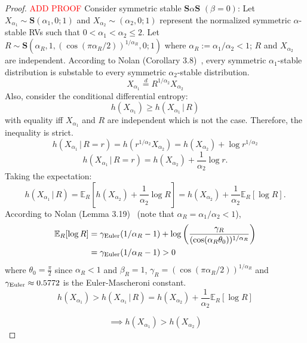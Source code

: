 \documentclass{article}
\theoremstyle{definition}
\begin{document}
\begin{proof}
    \textcolor{red}{ADD PROOF}
    Consider symmetric stable \(\mathbf{S}\alpha\mathbf{S}\) \((\beta=0)\):
    Let \(X_{\alpha_1}\sim\mathbf{S}(\alpha_1,0;1)\) and \(X_{\alpha_2}\sim(\alpha_2,0;1)\) represent the normalized symmetric \(\alpha\)-stable RVs such that \(0<\alpha_1<\alpha_2\le2\). Let \(R\sim\mathbf{S}(\alpha_R,1,(\cos(\pi\alpha_R/2))^{1/\alpha_R},0;1)\) where \(\alpha_R:=\alpha_1/\alpha_2<1\); \(R\) and \(X_{\alpha_2}\) are independent. According to Nolan (Corollary 3.8)~\cite{NolanJohnP2020USDM}, every symmetric \(\alpha_1\)-stable distribution is substable to every symmetric \(\alpha_2\)-stable distribution.
    \[
    X_{\alpha_1}\overset{d}{=}R^{1/\alpha_2}X_{\alpha_2}
    \]
    Also, consider the conditional differential entropy:
    \[
    h(X_{\alpha_1}) \ge h(X_{\alpha_1}\,|\,R)
    \]
    with equality iff \(X_{\alpha_1}\) and \(R\) are independent which is not the case. Therefore, the inequality is strict.
    \[    h(X_{\alpha_1}\,|\,R=r)=h(r^{1/\alpha_2}X_{\alpha_2})=h(X_{\alpha_2})+\log{r^{1/\alpha_2}}
    \]
    \[
    h(X_{\alpha_1}\,|\,R=r)=h(X_{\alpha_2})+\frac{1}{\alpha_2}\log{r}.
    \]
    Taking the expectation:
    \[
    h(X_{\alpha_1}\,|\,R) = \mathbb{E}_R\left[h(X_{\alpha_2})+\frac{1}{\alpha_2}\log{R}\right]=h(X_{\alpha_2})+\frac{1}{\alpha_2}\mathbb{E}_R[\log R].
    \]
    According to Nolan (Lemma 3.19)~\cite{NolanJohnP2020USDM} (note that \(\alpha_R=\alpha_1/\alpha_2<1\)),
    \begin{align*}
    \mathbb{E}_R[\log R]&=\gamma_{\rm Euler} (1/\alpha_R-1)+\log\left(\frac{\gamma_R}{(\cos (\alpha_R\theta_0))^{1/\alpha_R}}\right)\\
    &= \gamma_{\rm Euler} (1/\alpha_R-1) > 0
    \end{align*}
    where \(\theta_0=\frac{\pi}{2}\) since \(\alpha_R<1\) and \(\beta_R=1\), \(\gamma_R=(\cos(\pi\alpha_R/2))^{1/\alpha_R}\) and \(\gamma_{\rm Euler}\approx0.5772\) is the Euler-Mascheroni constant.
    \begin{equation}
    h(X_{\alpha_1}) > h(X_{\alpha_1}\,|\,R)=h(X_{\alpha_2})+\frac{1}{\alpha_2}\mathbb{E}_R[\log R]      
    \end{equation}

    \[
    \implies h(X_{\alpha_1}) > h(X_{\alpha_2})
    \]

\end{proof}
\end{document}
